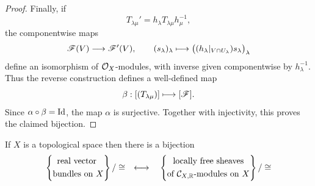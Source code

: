 \documentclass[12pt,a4paper]{article}
\begin{document}
\begin{proof}
    Finally, if
    \[
        T_{\lambda\mu}'
        =
        h_\lambda T_{\lambda\mu}h_\mu^{-1},
    \]
    the componentwise maps
    \[
        \mathscr{F}(V)\longrightarrow\mathscr{F}'(V),
        \qquad
        (s_\lambda)_\lambda
        \longmapsto
        \bigl((h_\lambda|_{V\cap U_\lambda})s_\lambda\bigr)_\lambda
    \]
    define an isomorphism of $\mathcal{O}_X$-modules, with inverse
    given componentwise by $h_\lambda^{-1}$.
    Thus the reverse construction defines a well-defined map
    \[
        \beta:[(T_{\lambda\mu})]\longmapsto[\mathscr{F}].
    \]
    Since $\alpha\circ\beta=\operatorname{Id}$, the map $\alpha$ is
    surjective. Together with injectivity, this proves the
    claimed bijection.
\end{proof}

\vsp

\begin{theorem}
    If $X$ is a topological space then there is a bijection
    \begin{equation}
        \left\{
            \begin{gathered}
            \textnormal{real vector }\\
            \textnormal{bundles on $X$}
            \end{gathered}
        \right\}/\cong \quad\longleftrightarrow\quad \left\{
            \begin{gathered}
            \textnormal{locally free sheaves} \\
            \textnormal{of }\mathcal{C}_{X,\mathbb{R}}\textnormal{-modules } \textnormal{on $X$}
            \end{gathered}
        \right\}/\cong
    \end{equation}
\end{theorem}
\end{document}
